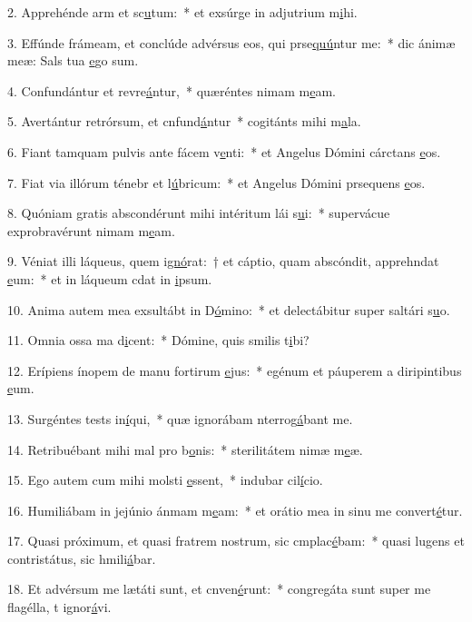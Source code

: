 2. Apprehénde arm et sc\uline{u}tum:~* et exsúrge in adjutrium m\uline{i}hi.\par 
3. Effúnde frámeam, et conclúde advérsus eos, qui prse\uline{quú}ntur me:~* dic ánimæ meæ: Sals tua \uline{e}go sum.\par 
4. Confundántur et revre\uline{á}ntur,~* quæréntes nimam m\uline{e}am.\par 
5. Avertántur retrórsum, et cnfund\uline{á}ntur~* cogitánts mihi m\uline{a}la.\par 
6. Fiant tamquam pulvis ante fácem v\uline{e}nti:~* et Angelus Dómini cárctans \uline{e}os.\par 
7. Fiat via illórum ténebr et l\uline{ú}bricum:~* et Angelus Dómini prsequens \uline{e}os.\par 
8. Quóniam gratis abscondérunt mihi intéritum lái s\uline{u}i:~* supervácue exprobravérunt nimam m\uline{e}am.\par 
9. Véniat illi láqueus, quem i\uline{gnó}rat:~† et cáptio, quam abscóndit, apprehndat \uline{e}um:~* et in láqueum cdat in \uline{i}psum.\par 
10. Anima autem mea exsultábt in D\uline{ó}mino:~* et delectábitur super saltári s\uline{u}o.\par 
11. Omnia ossa ma d\uline{i}cent:~* Dómine, quis smilis t\uline{i}bi?\par 
12. Erípiens ínopem de manu fortirum \uline{e}jus:~* egénum et páuperem a diripintibus \uline{e}um.\par 
13. Surgéntes tests in\uline{í}qui,~* quæ ignorábam nterrog\uline{á}bant me.\par 
14. Retribuébant mihi mal pro b\uline{o}nis:~* sterilitátem nimæ m\uline{e}æ.\par 
15. Ego autem cum mihi molsti \uline{e}ssent,~* indubar cil\uline{í}cio.\par 
16. Humiliábam in jejúnio ánmam m\uline{e}am:~* et orátio mea in sinu me convert\uline{é}tur.\par 
17. Quasi próximum, et quasi fratrem nostrum, sic cmplac\uline{é}bam:~* quasi lugens et contristátus, sic hmili\uline{á}bar.\par 
18. Et advérsum me lætáti sunt, et cnven\uline{é}runt:~* congregáta sunt super me flagélla, t ignor\uline{á}vi.\par 
